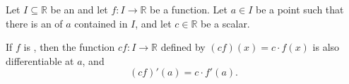 \begin{corollary} \label{corollary:derivative_of_real_scalar_multiple_of_differentiable_function_on_real_interval}
    Let $I \subseteq \mathbb{R}$ be an  and let $f : I \to \mathbb{R}$ be a function. Let $a \in I$ be a point such that there is an  of $a$ contained in $I$, and let $c \in \mathbb{R}$ be a scalar.

    If $f$ is , then the function $cf : I \to \mathbb{R}$ defined by $(cf)(x) = c \cdot f(x)$ is also differentiable at $a$, and
    $$(cf)'(a) = c \cdot f'(a).$$
\end{corollary}
